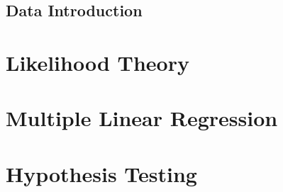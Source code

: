 % 
\section{Data Introduction}

\chapter{Likelihood Theory}
\label{ch:likelihood_theory}

\chapter{Multiple Linear Regression}\label{ch:Multip_linear_regresssion}




\chapter{Hypothesis Testing}
\label{ch:hypothesis_testing}

